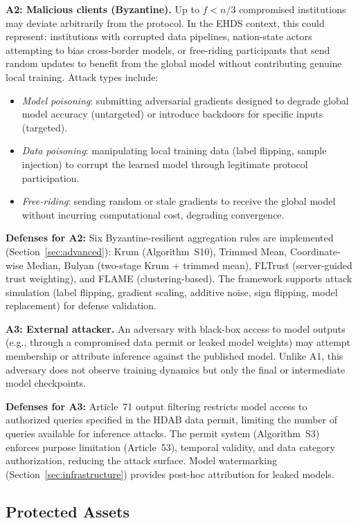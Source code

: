 \documentclass[conference]{IEEEtran}
\begin{document}
\textbf{A2: Malicious clients (Byzantine).} Up to $f < n/3$ compromised institutions may deviate arbitrarily from the protocol. In the EHDS context, this could represent: institutions with corrupted data pipelines, nation-state actors attempting to bias cross-border models, or free-riding participants that send random updates to benefit from the global model without contributing genuine local training. Attack types include:
\begin{itemize}
    \item \textit{Model poisoning}: submitting adversarial gradients designed to degrade global model accuracy (untargeted) or introduce backdoors for specific inputs (targeted).
    \item \textit{Data poisoning}: manipulating local training data (label flipping, sample injection) to corrupt the learned model through legitimate protocol participation.
    \item \textit{Free-riding}: sending random or stale gradients to receive the global model without incurring computational cost, degrading convergence.
\end{itemize}

\textbf{Defenses for A2:} Six Byzantine-resilient aggregation rules are implemented (Section~\ref{sec:advanced}): Krum (Algorithm~S10), Trimmed Mean, Coordinate-wise Median, Bulyan (two-stage Krum + trimmed mean), FLTrust (server-guided trust weighting), and FLAME (clustering-based). The framework supports attack simulation (label flipping, gradient scaling, additive noise, sign flipping, model replacement) for defense validation.

\textbf{A3: External attacker.} An adversary with black-box access to model outputs (e.g., through a compromised data permit or leaked model weights) may attempt membership or attribute inference against the published model. Unlike A1, this adversary does not observe training dynamics but only the final or intermediate model checkpoints.

\textbf{Defenses for A3:} Article~71 output filtering restricts model access to authorized queries specified in the HDAB data permit, limiting the number of queries available for inference attacks. The permit system (Algorithm~S3) enforces purpose limitation (Article~53), temporal validity, and data category authorization, reducing the attack surface. Model watermarking (Section~\ref{sec:infrastructure}) provides post-hoc attribution for leaked models.

\subsection{Protected Assets}
\end{document}
